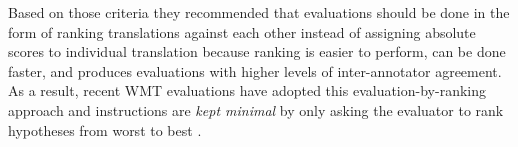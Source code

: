 
Based on those criteria they recommended that evaluations should be done in the form of ranking translations against each other  instead of assigning absolute scores to individual translation because ranking is easier to perform, can be done faster, and produces evaluations with higher levels of inter-annotator agreement. 
As a result, recent WMT evaluations have adopted this evaluation-by-ranking approach and instructions are \emph{kept minimal} by only asking the evaluator to rank hypotheses from worst to best \cite{Bojar2011}.

%

%
%

